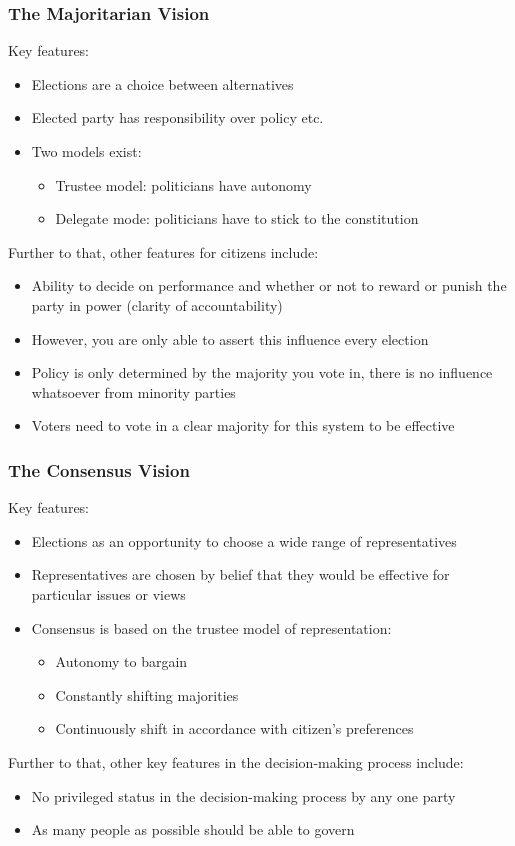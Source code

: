 \documentclass[12pt, letterpaper]{article}
\begin{document}
\subsubsection{The Majoritarian Vision}
Key features:
\begin{itemize}
	\item Elections are a choice between alternatives
	\item Elected party has responsibility over policy etc.
	\item Two models exist:
		\begin{itemize}
			\item Trustee model: politicians have autonomy
			\item Delegate mode: politicians have to stick to the constitution
		\end{itemize}
\end{itemize}
Further to that, other features for citizens include:
\begin{itemize}
	\item Ability to decide on performance and whether or not to reward or punish the party in power (clarity of accountability)
	\item However, you are only able to assert this influence every election
	\item Policy is only determined by the majority you vote in, there is no influence whatsoever from minority parties
	\item Voters need to vote in a clear majority for this system to be effective
\end{itemize}

\subsubsection{The Consensus Vision}
Key features:
\begin{itemize}
	\item Elections as an opportunity to choose a wide range of representatives
	\item Representatives are chosen by belief that they would be effective for particular issues or views
	\item Consensus is based on the trustee model of representation:
		\begin{itemize}
			\item Autonomy to bargain
			\item Constantly shifting majorities
			\item Continuously shift in accordance with citizen's preferences
		\end{itemize}
\end{itemize}
Further to that, other key features in the decision-making process include:
\begin{itemize}
	\item No privileged status in the decision-making process by any one party
	\item As many people as possible should be able to govern
\end{itemize}
\end{document}
